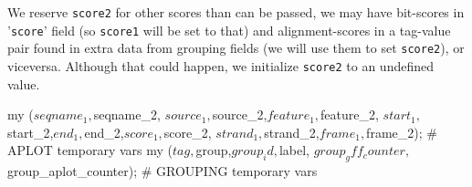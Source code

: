 \documentclass[11pt]{article}
\def\nwendcode{\endtrivlist \endgroup} %
\let\nwdocspar=\par                    %
\begin{document}
We reserve {\tt{}{}score{}2} for other scores than can be passed, we may have bit-scores in '{\tt{}score}' field (so {\tt{}{}score{}1} will be set to that) and alignment-scores in a tag-value pair found in extra data from grouping fields (we will use them to set {\tt{}{}score{}2}), or viceversa. Although that could happen, we initialize {\tt{}{}score{}2} to an undefined value.

\nwenddocs{}\plusendmoddef
my ($seqname_1,$seqname_2,
    $source_1,$source_2,$feature_1,$feature_2,
    $start_1,$start_2,$end_1,$end_2,$score_1,$score_2,
    $strand_1,$strand_2,$frame_1,$frame_2); # APLOT temporary vars
my ($tag,$group,$group_id,$label,
    $group_gff_counter,$group_aplot_counter); # GROUPING temporary vars
\nwendcode{}\nwdocspar

\begin{table}[!t]
\begin{center}
\parbox{0.75\linewidth}{
\caption[Retrieving second element when missing in old APLOT format]{\label{tbl:missingfields} For {\prog} old format, when in a ':' field pair the second element is missing, second is set to first element.}
} %
\end{center}
\end{table}
\end{document}
